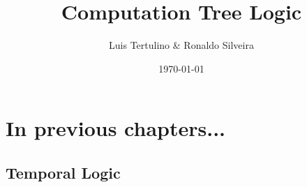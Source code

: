 \documentclass[notes=show]{beamer}
\title{Computation Tree Logic}
\author{Luis Tertulino \& Ronaldo Silveira}
\date{\today}
\begin{document}
\begin{frame}
	\titlepage
\end{frame}

\begin{frame}
\tableofcontents
\end{frame}

\section{In previous chapters...}
\subsection{Temporal Logic}
















\end{document}

